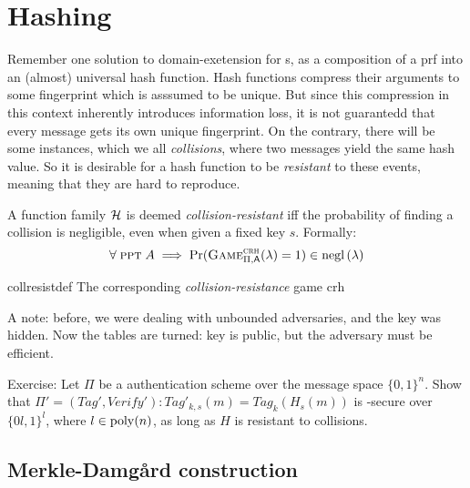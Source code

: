 \section{Hashing}

Remember one solution to domain-exetension for \prf{}s, as a composition of a prf into an (almost) universal hash function. Hash functions compress their arguments to some fingerprint which is asssumed to be unique. But since this compression in this context inherently introduces information loss, it is not guarantedd that every message gets its own unique fingerprint. On the contrary, there will be some instances, which we all \emph{collisions}, where two messages yield the same hash value. So it is desirable for a hash function to be \emph{resistant} to these events, meaning that they are hard to reproduce.

\begin{definition}
    A function family $\mathcal{H}$ is deemed \emph{collision-resistant} iff the probability of finding a collision is negligible, even when given a fixed key $s$. Formally:
    \[
        \forall\; \ppt\; A \implies \Pr(\cryptog{crh}(\lambda) = 1) \in \negl{\lambda} 
    \]

    \begin{cryptogame}
        {collresistdef}
        {The corresponding \emph{collision-resistance} game}
        {crh}


        
    \end{cryptogame}
\end{definition}

A note: before, we were dealing with unbounded adversaries, and the key was hidden. Now the tables are turned: key is public, but the adversary must be efficient.

Exercise: Let $\Pi$ be a \ufcma authentication scheme over the message space $\{0, 1\}^n$. Show that $\Pi' = (Tag', Verify') : Tag'_{k, s}(m) = Tag_k(H_s(m))$ is \ufcma-secure over $\{0l, 1\}^l$, where $l \in \mathrm{poly}(n)$, as long as $H$ is resistant to collisions.

\subsection{Merkle-Damg\r{a}rd construction}


